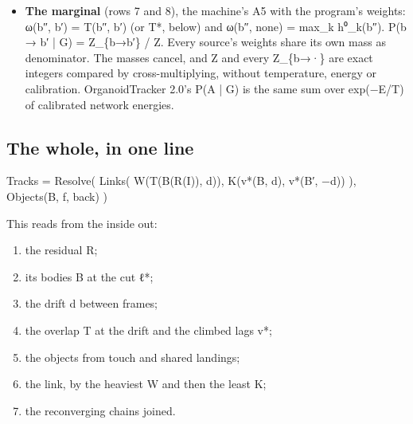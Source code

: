\begin{itemize}
\begin{itemize}
\item pass 1: N = σ ∘ (S\_\allowbreak{}A m\_\allowbreak{}B − S\_\allowbreak{}B m\_\allowbreak{}A) per pair, where σ\_\allowbreak{}a = voxel\_\allowbreak{}pm\_\allowbreak{}a / gcd(voxel\_\allowbreak{}pm);
\item pass 2 reads two pass-1 records: dot = N · N′, c = COMPARE(dot + 1, 1) = sign(dot);
\item retained = c (c + 1) and crossed = c (c − 1).
\end{itemize}

dot is (c\_\allowbreak{}A − c\_\allowbreak{}B)·(c\_\allowbreak{}A′ − c\_\allowbreak{}B′) in physical space times the positive m\_\allowbreak{}A m\_\allowbreak{}B m\_\allowbreak{}A′ m\_\allowbreak{}B′ / gcd², and its sign is exact. Two membranes cannot pass through one another, and a real pair retains its side. dot = 0 includes A′ = B′, the pair landing on one body.
\item \textbf{The marginal} (rows 7 and 8), the machine's A5 with the program's weights: ω(b″, b′) = T(b″, b′) (or T*, below) and ω(b″, none) = max\_\allowbreak{}k h⁰\_\allowbreak{}k(b″). P(b → b′ | G) = Z\_\allowbreak{}\{b→b′\} / Z. Every source's weights share its own mass as denominator. The masses cancel, and Z and every Z\_\allowbreak{}\{b→·\} are exact integers compared by cross-multiplying, without temperature, energy or calibration. OrganoidTracker 2.0's P(A | G) is the same sum over exp(−E/T) of calibrated network energies.
\end{itemize}

\subsection{\texorpdfstring{The whole, in one line}{The whole, in one line}}

Tracks = Resolve( Links( W(T(B(R(I)), d)), K(v*(B, d), v*(B′, −d)) ), Objects(B, f, back) )

This reads from the inside out:

\begin{enumerate}
\item the residual R;
\item its bodies B at the cut ℓ*;
\item the drift d between frames;
\item the overlap T at the drift and the climbed lags v*;
\item the objects from touch and shared landings;
\item the link, by the heaviest W and then the least K;
\item the reconverging chains joined.
\end{enumerate}

